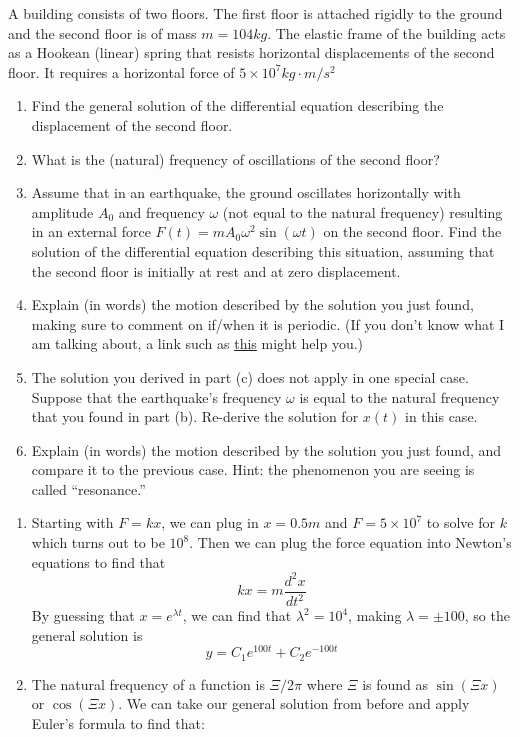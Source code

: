 \documentclass[11pt,answers]{exam}
\begin{document}
\begin{questions}
\item A building consists of two floors. The first floor is attached rigidly to the ground and the second floor is of mass $m = 104 kg$. The elastic frame of the building acts as a Hookean (linear) spring that resists horizontal displacements of the second floor. It requires a horizontal force of $5\times 10^7 kg \cdot m/s^2$
\begin{enumerate}
\item Find the general solution of the differential equation describing the displacement of the second floor.
\item What is the (natural) frequency of oscillations of the second floor?
\item Assume that in an earthquake, the ground oscillates horizontally with amplitude $A_0$ and frequency $\omega$ (not equal to the natural frequency) resulting in an external force $F(t) =m A_0 \omega^2\sin(\omega t)$ on the second floor.  Find the solution of the differential equation describing this situation, assuming that the second floor is initially at rest and at zero displacement.
\item Explain (in words) the motion described by the solution you just found, making sure to comment on if/when it is periodic. (If you don’t know what I am talking about, a link such as \href{https://mathblag.wordpress.com/2013/09/01/sums-of-periodic-functions/}{this} might help you.)
\item The solution you derived in part (c) does not apply in one special case. Suppose that the earthquake’s frequency $\omega$ is equal to the natural frequency that you found in part (b). Re-derive the solution for $x(t)$ in this case.
\item Explain (in words) the motion described by the solution you just found, and compare it to the previous case. Hint: the phenomenon you are seeing is called “resonance.”
\end{enumerate}
\begin{solution}
\begin{enumerate}
\item Starting with $F = kx$, we can plug in $x = 0.5m$ and $F = 5\times 10^7$ to solve for $k$ which turns out to be $10^8$.  Then we can plug the force equation into Newton's equations to find that
\[
kx = m\frac{d^2x}{dt^2}
\]
By guessing that $x = e^{\lambda t}$, we can find that $\lambda^2 = 10^4$, making $\lambda = \pm 100$, so the general solution is
\[
y = C_1e^{100t} + C_2e^{-100t}
\]

\item The natural frequency of a function is $\Xi/2\pi$ where $\Xi$ is found as $\sin{(\Xi x)}$ or $\cos{(\Xi x)}$.  We can take our general solution from before and apply Euler's formula to find that:


\end{enumerate}
\end{solution}
\end{questions}
\end{document}
